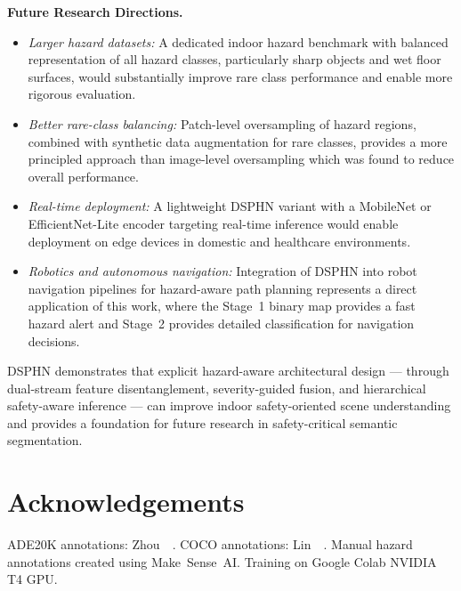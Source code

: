 \noindent\textbf{Future Research Directions.}

\begin{itemize}
\item \textit{Larger hazard datasets:} A dedicated indoor hazard
benchmark with balanced representation of all hazard classes,
particularly sharp objects and wet floor surfaces, would
substantially improve rare class performance and enable more
rigorous evaluation.

\item \textit{Better rare-class balancing:} Patch-level oversampling
of hazard regions, combined with synthetic data augmentation for
rare classes, provides a more principled approach than image-level
oversampling which was found to reduce overall performance.

\item \textit{Real-time deployment:} A lightweight DSPHN variant
with a MobileNet or EfficientNet-Lite encoder targeting real-time
inference would enable deployment on edge devices in domestic and
healthcare environments.

\item \textit{Robotics and autonomous navigation:} Integration of
DSPHN into robot navigation pipelines for hazard-aware path
planning represents a direct application of this work, where the
Stage~1 binary map provides a fast hazard alert and Stage~2
provides detailed classification for navigation decisions.
\end{itemize}

DSPHN demonstrates that explicit hazard-aware architectural design
— through dual-stream feature disentanglement, severity-guided
fusion, and hierarchical safety-aware inference — can improve
indoor safety-oriented scene understanding and provides a
foundation for future research in safety-critical semantic
segmentation.

\section*{Acknowledgements}
ADE20K annotations: Zhou~\etal~\cite{zhou2017scene}.
COCO annotations: Lin~\etal~\cite{lin2014coco}.
Manual hazard annotations created using Make~Sense~AI.
Training on Google Colab NVIDIA T4 GPU.
